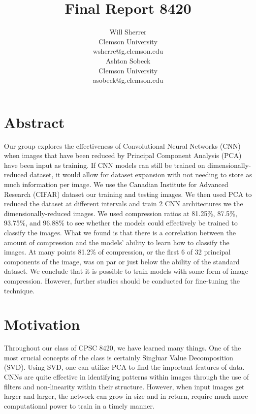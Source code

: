 \documentclass{article}
\title{Final Report 8420}
\author{%
	Will Sherrer \\
	Clemson University\\
	wsherre@g.clemson.edu \\
	\And Ashton Sobeck \\
	Clemson University\\
	asobeck@g.clemson.edu
}
\begin{document}
\maketitle
\section{Abstract} 

Our group explores the effectiveness of Convolutional Neural Networks (CNN) when  images that have been reduced by Principal Component Analysis (PCA) have been input as training. If CNN models can still be trained on dimensionally-reduced dataset, it would allow for dataset expansion with not needing to store as much information per image. We use the Canadian Institute for Advanced Research (CIFAR) dataset our training and testing images. We then used PCA to reduced the dataset at different intervals and train 2 CNN architectures we the dimensionally-reduced images. We used compression ratios at 81.25\%, 87.5\%, 93.75\%, and 96.88\% to see whether the models could effectively be trained to classify the images. What we found is that there is a correlation between the amount of compression and the models' ability to learn how to classify the images. At many points 81.2\% of compression, or the first 6 of 32 principal components of the image, was on par or just below the ability of the standard dataset. We conclude that it is possible to train models with some form of image compression. However, further studies should be conducted for fine-tuning the technique. 

\section{Motivation}

Throughout our class of CPSC 8420, we have learned many things. 
One of the most crucial concepts of the class is certainly Singluar Value 
Decomposition (SVD). Using SVD, one can utilize PCA to find the important 
features of data. CNNs are quite effective in identifying patterns within 
images through the use of filters and non-linearity within their structure. 
However, when input images get larger and larger, the network can grow in 
size and in return, require much more computational power to train in a timely manner.
\end{document}
